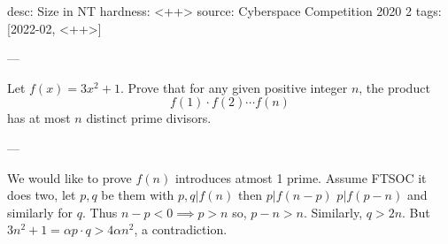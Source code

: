 desc: Size in NT
hardness: <++>
source: Cyberspace Competition 2020 2
tags: [2022-02, <++>]

---

Let $f(x) = 3x^2+1$. Prove that for any given positive integer $n$, the
product
\[f(1) \cdot f(2) \cdots f(n)\]
has at most $n$ distinct prime divisors.

---

We would like to prove $f(n)$ introduces atmost 1 prime. Assume FTSOC
it does two, let $p,q$ be them with $p,q | f(n)$ then $p|f(n-p)$ $p | f(p-n)$ and similarly for $q$. 
Thus $n - p < 0 \implies p > n$ so, $p -n > n$. Similarly, $q > 2n$. 
But $3n^2 +1 = \alpha p \cdot q > 4\alpha n^2$, a contradiction.
